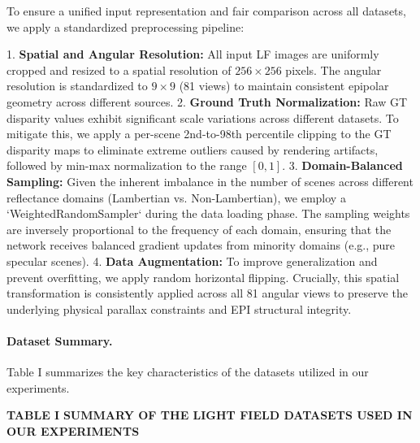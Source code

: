 \documentclass[lettersize,journal]{IEEEtran}
\begin{document}
To ensure a unified input representation and fair comparison across all datasets, we apply a standardized preprocessing pipeline:

1. \textbf{Spatial and Angular Resolution:} All input LF images are uniformly cropped and resized to a spatial resolution of $256 \times 256$ pixels. The angular resolution is standardized to $9 \times 9$ (81 views) to maintain consistent epipolar geometry across different sources.
2. \textbf{Ground Truth Normalization:} Raw GT disparity values exhibit significant scale variations across different datasets. To mitigate this, we apply a per-scene 2nd-to-98th percentile clipping to the GT disparity maps to eliminate extreme outliers caused by rendering artifacts, followed by min-max normalization to the range $[0, 1]$.
3. \textbf{Domain-Balanced Sampling:} Given the inherent imbalance in the number of scenes across different reflectance domains (Lambertian vs. Non-Lambertian), we employ a `WeightedRandomSampler` during the data loading phase. The sampling weights are inversely proportional to the frequency of each domain, ensuring that the network receives balanced gradient updates from minority domains (e.g., pure specular scenes).
4. \textbf{Data Augmentation:} To improve generalization and prevent overfitting, we apply random horizontal flipping. Crucially, this spatial transformation is consistently applied across all 81 angular views to preserve the underlying physical parallax constraints and EPI structural integrity.

\paragraph{Dataset Summary.}

Table I summarizes the key characteristics of the datasets utilized in our experiments.

\textbf{TABLE I}  
\textbf{SUMMARY OF THE LIGHT FIELD DATASETS USED IN OUR EXPERIMENTS}
\end{document}
